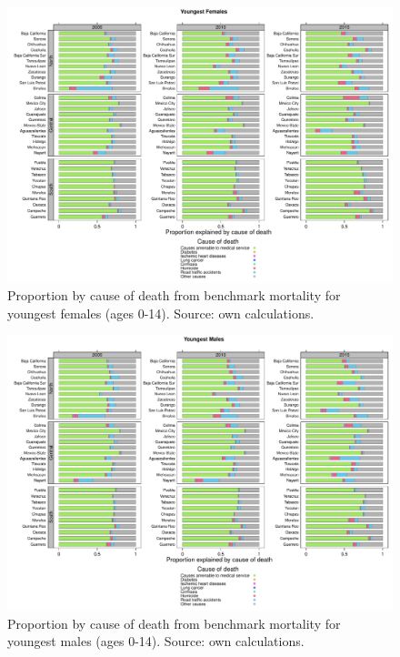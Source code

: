 \documentclass[11.5pt]{article}
\begin{document}
{\begin{figure}
\centering
\caption{Proportion by cause of death from benchmark mortality for youngest females (ages 0-14). Source: own calculations.}
\begin{center}
\includegraphics[scale=.5]{Figures/Figure_prop_yf.pdf}
\end{center}
\end{figure}

\begin{figure}
\centering
\caption{Proportion by cause of death from benchmark mortality for youngest males (ages 0-14). Source: own calculations.}
\begin{center}
\includegraphics[scale=.5]{Figures/Figure_prop_ym.pdf}
\end{center}
\end{figure}



}
\end{document}
